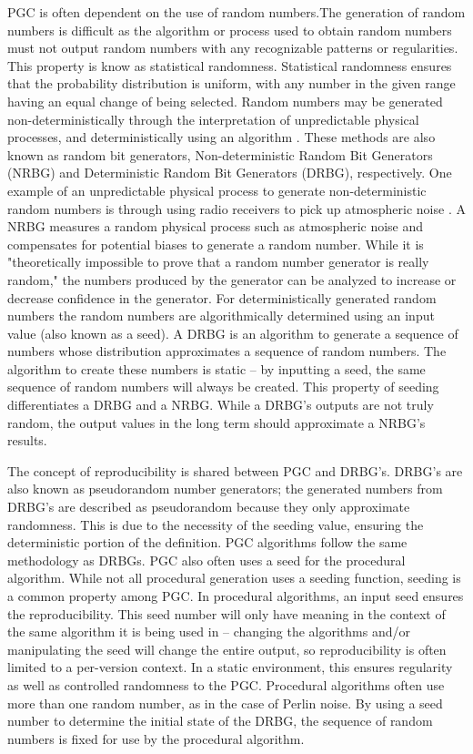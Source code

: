 \documentclass[10pt]{report}
\begin{document}
			PGC is often dependent on the use of random numbers.The generation of random numbers is difficult as the algorithm or process used to obtain random numbers must not output random numbers with any recognizable patterns or regularities. This property is know as statistical randomness. Statistical randomness ensures that the probability distribution is uniform, with any number in the given range having an equal change of being selected. Random numbers may be generated non-deterministically through the interpretation of unpredictable physical processes, and deterministically using an algorithm \cite{rng}. These methods are also known as random bit generators, Non-deterministic Random Bit Generators (NRBG) and Deterministic Random Bit Generators (DRBG), respectively. One example of an unpredictable physical process to generate non-deterministic random numbers is through using radio receivers to pick up atmospheric noise \cite{random-org}. A NRBG measures a random physical process such as atmospheric noise and compensates for potential biases to generate a random number. While it is "theoretically impossible to prove that a random number generator is really random," the numbers produced by the generator can be analyzed to increase or decrease confidence in the generator. For deterministically generated random numbers the random numbers are algorithmically determined using an input value (also known as a seed). A DRBG is an algorithm to generate a sequence of numbers whose distribution approximates a sequence of random numbers. The algorithm to create these numbers is static -- by inputting a seed, the same sequence of random numbers will always be created. This property of seeding differentiates a DRBG and a NRBG. While a DRBG's outputs are not truly random, the output values in the long term should approximate a NRBG's results. 
			
			The concept of reproducibility is shared between PGC and DRBG's. DRBG's are also known as pseudorandom number generators; the generated numbers from DRBG's are described as pseudorandom because they only approximate randomness. This is due to the necessity of the seeding value, ensuring the deterministic portion of the definition. PGC algorithms follow the same methodology as DRBGs. PGC also often uses a seed for the procedural algorithm. While not all procedural generation uses a seeding function, seeding is a common property among PGC. In procedural algorithms, an input seed ensures the reproducibility. This seed number will only have meaning in the context of the same algorithm it is being used in -- changing the algorithms and/or manipulating the seed will change the entire output, so reproducibility is often limited to a per-version context. In a static environment, this ensures regularity as well as controlled randomness to the PGC. Procedural algorithms often use more than one random number, as in the case of Perlin noise. By using a seed number to determine the initial state of the DRBG, the sequence of random numbers is fixed for use by the procedural algorithm. 
			
\end{document}
